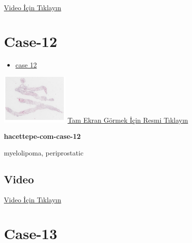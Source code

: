 \documentclass[
  letterpaper,
  DIV=11,
  numbers=noendperiod]{scrreprt}
\providecommand{\tightlist}{%
  \setlength{\itemsep}{0pt}\setlength{\parskip}{0pt}}\usepackage{longtable,booktabs,array}
\begin{document}
\href{https://www.youtube.com/watch?v=A5XO1Kp11Zk}{Video İçin Tıklayın}

\hypertarget{sec-hacettepe-case-of-the-month-case-12}{%
\section{Case-12}\label{sec-hacettepe-case-of-the-month-case-12}}

\begin{itemize}
\tightlist
\item
  \href{https://www.youtube.com/watch?v=2TwT4sE9XmM\&ab_channel=KemalKosemehmetoglu}{case
  12}
\end{itemize}

\href{https://images.patolojiatlasi.com/hacettepe-com-case-12/HE.html}{\includegraphics[width=0.25\textwidth,height=\textheight]{./screenshots/thumbnail_hacettepe-com-case-12.png}}
\href{https://images.patolojiatlasi.com/hacettepe-com-case-12/HE.html}{Tam
Ekran Görmek İçin Resmi Tıklayın}

\textbf{hacettepe-com-case-12}

\begin{tcolorbox}[enhanced jigsaw, colbacktitle=quarto-callout-tip-color!10!white, colback=white, titlerule=0mm, opacityback=0, colframe=quarto-callout-tip-color-frame, opacitybacktitle=0.6, bottomrule=.15mm, breakable, coltitle=black, title=\textcolor{quarto-callout-tip-color}{\faLightbulb}\hspace{0.5em}{Tanı}, toprule=.15mm, toptitle=1mm, bottomtitle=1mm, arc=.35mm, rightrule=.15mm, leftrule=.75mm, left=2mm]

myelolipoma, periprostatic

\end{tcolorbox}

\hypertarget{video-10}{%
\subsection{Video}\label{video-10}}

\href{https://www.youtube.com/watch?v=2TwT4sE9XmM}{Video İçin Tıklayın}

\hypertarget{sec-hacettepe-case-of-the-month-case-13}{%
\section{Case-13}\label{sec-hacettepe-case-of-the-month-case-13}}
\end{document}
